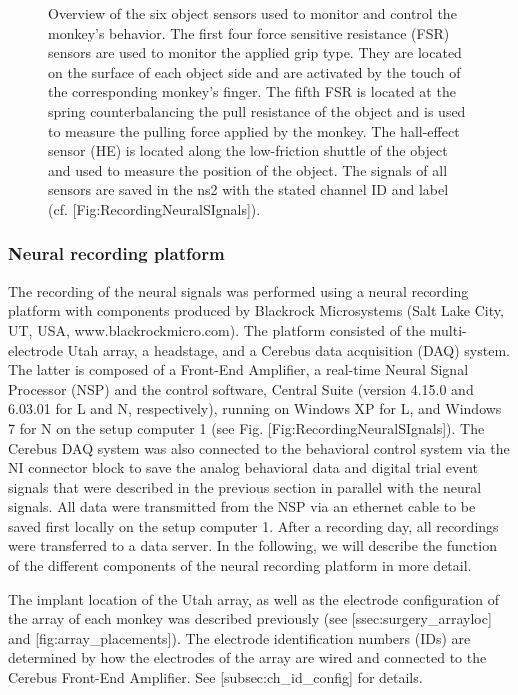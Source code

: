 {\begin{figure}
 \caption[Overview of six objects sensonsr to monitor and control the monkey's behavior]{Overview of the six object sensors used to monitor and control the monkey's behavior. The first four force sensitive resistance (FSR) sensors are used to monitor the applied grip type. They are located on the surface of each object side and are activated by the touch of the corresponding monkey's finger. The fifth FSR is located at the spring counterbalancing the pull resistance of the object and is used to measure the pulling force applied by the monkey. The hall-effect sensor (HE) is located along the low-friction shuttle of the object and used to measure the position of the object. The signals of all sensors are saved in the ns2 with the stated channel ID and label (cf. [Fig:RecordingNeuralSIgnals]).}
\end{figure}


\subsubsection{Neural recording platform}



The recording of the neural signals was performed using a neural recording platform with components produced by Blackrock Microsystems (Salt Lake City, UT, USA, www.blackrockmicro.com). The platform consisted of the multi-electrode Utah array, a headstage, and a Cerebus data acquisition (DAQ) system. The latter is composed of a Front-End Amplifier, a real-time Neural Signal Processor (NSP) and the control software, Central Suite (version 4.15.0 and 6.03.01 for L and N, respectively), running on Windows XP for L, and Windows 7 for N on the setup computer 1 (see Fig. [Fig:RecordingNeuralSIgnals]). The Cerebus DAQ system was also connected to the behavioral control system via the NI connector block to save the analog behavioral data and digital trial event signals that were described in the previous section in parallel with the neural signals. All data were transmitted from the NSP via an ethernet cable to be saved first locally on the setup computer 1. After a recording day, all recordings were transferred to a data server. In the following, we will describe the function of the different components of the neural recording platform in more detail.

The implant location of the Utah array, as well as the electrode configuration of the array of each monkey was described previously (see [ssec:surgery\_arrayloc] and [fig:array\_placements]). The electrode identification numbers (IDs) are determined by how the electrodes of the array are wired and connected to the Cerebus Front-End Amplifier. See [subsec:ch\_id\_config] for details.

}
